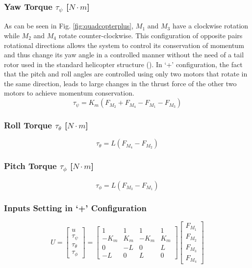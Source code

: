 \subsubsection{Yaw Torque $\tau_{\psi}$ [$N\cdot m$]}
As can be seen in Fig. \ref{fig:quadcopterplus}, $M_1$ and $M_3$ have a clockwise rotation while $M_2$ and $M_4$ rotate counter-clockwise. This configuration of opposite pairs rotational directions allows the system to control its conservation of momentum and thus change its yaw angle in a controlled manner without the need of a tail rotor used in the standard helicopter structure (\cite{Bresciani2008}). In `+' configuration, the fact that the pitch and roll angles are controlled using only two motors that rotate in the same direction, leads to large changes in the thrust force of the other two motors to achieve momentum conservation.
\begin{equation}
\tau_{\psi} = K_{m}(F_{M_2} + F_{M_4} - F_{M_1} - F_{M_3})
\end{equation}

\subsubsection{Roll Torque $\tau_{\theta}$ [$N\cdot m$]}
\begin{equation}
\tau_{\theta} = L(F_{M_4}-F_{M_2})
\end{equation}

\subsubsection{Pitch Torque $\tau_{\phi}$ [$N\cdot m$]}
\begin{equation}
\tau_{\phi} = L(F_{M_3}-F_{M_1})
\end{equation}

\subsubsection{Inputs Setting in `+' Configuration}
\begin{equation}
	U = \begin{bmatrix}
	u\\[5pt]
	\tau_{\psi}\\[5pt]
	\tau_{\theta}\\[5pt]
	\tau_{\phi}
	\end{bmatrix} = \begin{bmatrix}
	1 & 1 & 1 & 1 \\[5pt]
	-K_{m} & K_{m} & -K_{m} & K_{m}\\[5pt]
	0 & -L & 0 & L\\[5pt]
	-L & 0 & L & 0
							\end{bmatrix}
\begin{bmatrix}
F_{M_1}\\[5pt]
F_{M_2}\\[5pt]
F_{M_3}\\[5pt]
F_{M_4}
\end{bmatrix}
	\label{ec:U_X}						
\end{equation}

